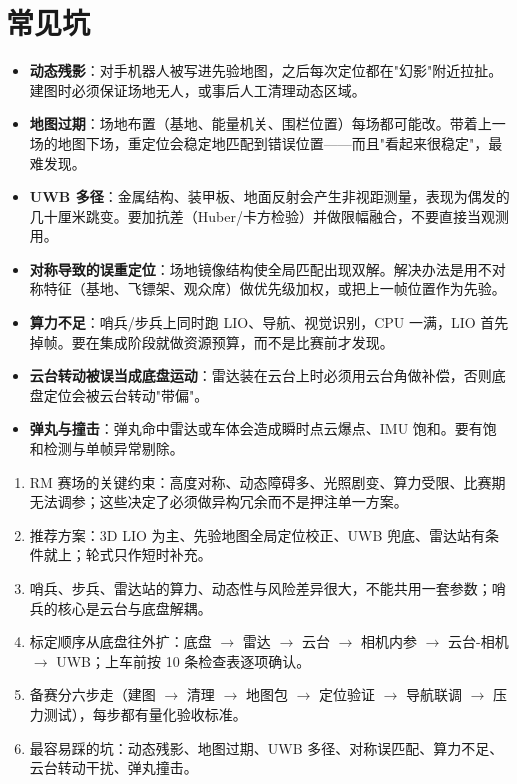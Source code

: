 \section{常见坑}\label{sec:29-pitfalls}

\begin{itemize}
  \item \textbf{动态残影}：对手机器人被写进先验地图，之后每次定位都在"幻影"附近拉扯。建图时必须保证场地无人，或事后人工清理动态区域。
  \item \textbf{地图过期}：场地布置（基地、能量机关、围栏位置）每场都可能改。带着上一场的地图下场，重定位会稳定地匹配到错误位置——而且"看起来很稳定"，最难发现。
  \item \textbf{UWB 多径}：金属结构、装甲板、地面反射会产生非视距测量，表现为偶发的几十厘米跳变。要加抗差（Huber/卡方检验）并做限幅融合，不要直接当观测用。
  \item \textbf{对称导致的误重定位}：场地镜像结构使全局匹配出现双解。解决办法是用不对称特征（基地、飞镖架、观众席）做优先级加权，或把上一帧位置作为先验。
  \item \textbf{算力不足}：哨兵/步兵上同时跑 LIO、导航、视觉识别，CPU 一满，LIO 首先掉帧。要在集成阶段就做资源预算，而不是比赛前才发现。
  \item \textbf{云台转动被误当成底盘运动}：雷达装在云台上时必须用云台角做补偿，否则底盘定位会被云台转动"带偏"。
  \item \textbf{弹丸与撞击}：弹丸命中雷达或车体会造成瞬时点云爆点、IMU 饱和。要有饱和检测与单帧异常剔除。
\end{itemize}

\begin{summary}

\begin{enumerate}
  \item RM 赛场的关键约束：高度对称、动态障碍多、光照剧变、算力受限、比赛期无法调参；这些决定了必须做异构冗余而不是押注单一方案。
  \item 推荐方案：3D LIO 为主、先验地图全局定位校正、UWB 兜底、雷达站有条件就上；轮式只作短时补充。
  \item 哨兵、步兵、雷达站的算力、动态性与风险差异很大，不能共用一套参数；哨兵的核心是云台与底盘解耦。
  \item 标定顺序从底盘往外扩：底盘 $\to$ 雷达 $\to$ 云台 $\to$ 相机内参 $\to$ 云台-相机 $\to$ UWB；上车前按 10 条检查表逐项确认。
  \item 备赛分六步走（建图 $\to$ 清理 $\to$ 地图包 $\to$ 定位验证 $\to$ 导航联调 $\to$ 压力测试），每步都有量化验收标准。
  \item 最容易踩的坑：动态残影、地图过期、UWB 多径、对称误匹配、算力不足、云台转动干扰、弹丸撞击。
\end{enumerate}


\end{summary}

